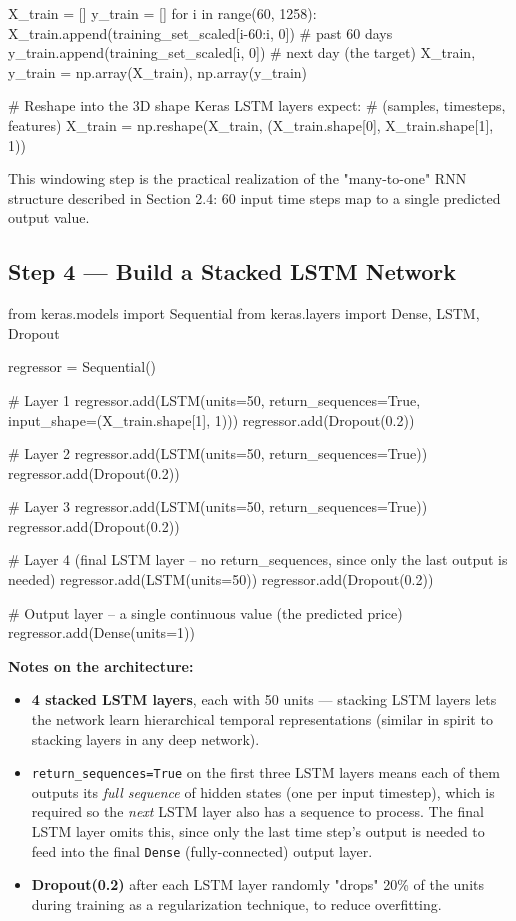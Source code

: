 \documentclass[12pt,openany]{book}
\theoremstyle{definition}
\theoremstyle{remark}
\begin{document}
\begin{python}
X_train = []
y_train = []
for i in range(60, 1258):
    X_train.append(training_set_scaled[i-60:i, 0])   # past 60 days
    y_train.append(training_set_scaled[i, 0])          # next day (the target)
X_train, y_train = np.array(X_train), np.array(y_train)

# Reshape into the 3D shape Keras LSTM layers expect:
# (samples, timesteps, features)
X_train = np.reshape(X_train, (X_train.shape[0], X_train.shape[1], 1))
\end{python}

This windowing step is the practical realization of the "many-to-one" RNN structure described in Section 2.4: 60 input time steps map to a single predicted output value.

\subsection{Step 4 --- Build a Stacked LSTM Network}

\begin{python}
from keras.models import Sequential
from keras.layers import Dense, LSTM, Dropout

regressor = Sequential()

# Layer 1
regressor.add(LSTM(units=50, return_sequences=True, input_shape=(X_train.shape[1], 1)))
regressor.add(Dropout(0.2))

# Layer 2
regressor.add(LSTM(units=50, return_sequences=True))
regressor.add(Dropout(0.2))

# Layer 3
regressor.add(LSTM(units=50, return_sequences=True))
regressor.add(Dropout(0.2))

# Layer 4 (final LSTM layer -- no return_sequences, since only the last output is needed)
regressor.add(LSTM(units=50))
regressor.add(Dropout(0.2))

# Output layer -- a single continuous value (the predicted price)
regressor.add(Dense(units=1))
\end{python}

\textbf{Notes on the architecture:}
\begin{itemize}
\item \textbf{4 stacked LSTM layers}, each with 50 units --- stacking LSTM layers lets the network learn hierarchical temporal representations (similar in spirit to stacking layers in any deep network).
\item \texttt{return\_sequences=True} on the first three LSTM layers means each of them outputs its \emph{full sequence} of hidden states (one per input timestep), which is required so the \emph{next} LSTM layer also has a sequence to process. The final LSTM layer omits this, since only the last time step's output is needed to feed into the final \texttt{Dense} (fully-connected) output layer.
\item \textbf{Dropout(0.2)} after each LSTM layer randomly "drops" 20\% of the units during training as a regularization technique, to reduce overfitting.

\end{itemize}
\end{document}
